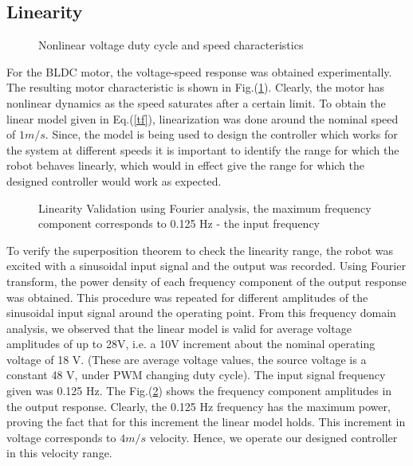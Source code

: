 \documentclass[conference]{IEEEtran}
\begin{document}
\subsection{Linearity}
\begin{figure}[htbp]

			  \centering
%			  
			  \def\svgscale{0.25}
			  \tiny{
			  }
			  \caption{Nonlinear voltage duty cycle and speed characteristics}
			 \label{bldcNL}
		\end{figure}
For the BLDC motor, the voltage-speed response was obtained experimentally. The resulting motor characteristic is shown in Fig.(\ref{bldcNL}). Clearly, the motor has nonlinear dynamics as the speed saturates after a certain limit. To obtain the linear model given in Eq.(\ref{tf}), linearization was done around the nominal speed of $1m/s$. Since, the model is being used to design the controller which works for the system at different speeds it is important to identify the range for which the robot behaves linearly, which would in effect give the range for which the designed controller would work as expected.

\begin{figure}[htbp]

			  \centering
%			  
			  \def\svgscale{0.25}
			  \tiny{
			  }
			  \caption{Linearity Validation using Fourier analysis, the maximum frequency component corresponds to 0.125 Hz - the input frequency}
			 \label{sine}
		\end{figure}
To verify the superposition theorem to check the linearity range, the robot was excited with a sinusoidal input signal and the output was recorded. Using Fourier transform, the power density of each frequency component of the output response was obtained. This procedure was repeated for different amplitudes of the sinusoidal input signal around the operating point. From this frequency domain analysis, we observed that the linear model is valid for average voltage amplitudes of up to 28V, i.e. a  10V increment about the nominal operating voltage of 18 V. (These are average voltage values, the source voltage is a constant 48 V, under PWM changing duty cycle). The input signal frequency given was 0.125 Hz. The Fig.(\ref{sine}) shows the frequency component amplitudes in the output response. Clearly, the 0.125 Hz frequency has the maximum power, proving the fact that for this increment the linear model holds. This increment in voltage corresponds to $4m/s$ velocity. Hence, we operate our designed controller in this velocity range.    
\end{document}

